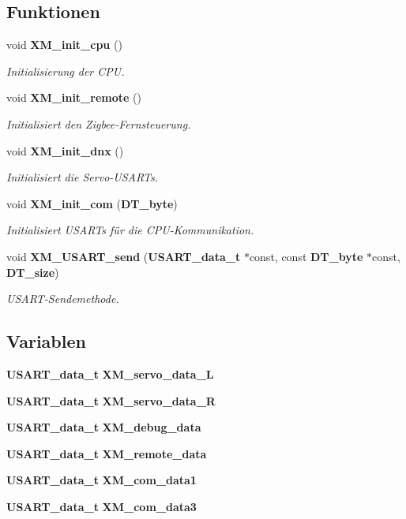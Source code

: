 \subsection*{Funktionen}
\begin{DoxyCompactItemize}
\item 
void {\bf XM\_\-init\_\-cpu} ()
\begin{DoxyCompactList}\small\item\em Initialisierung der CPU. \item\end{DoxyCompactList}\item 
void {\bf XM\_\-init\_\-remote} ()
\begin{DoxyCompactList}\small\item\em Initialisiert den Zigbee-\/Fernsteuerung. \item\end{DoxyCompactList}\item 
void {\bf XM\_\-init\_\-dnx} ()
\begin{DoxyCompactList}\small\item\em Initialisiert die Servo-\/USARTs. \item\end{DoxyCompactList}\item 
void {\bf XM\_\-init\_\-com} ({\bf DT\_\-byte})
\begin{DoxyCompactList}\small\item\em Initialisiert USARTs für die CPU-\/Kommunikation. \item\end{DoxyCompactList}\item 
void {\bf XM\_\-USART\_\-send} ({\bf USART\_\-data\_\-t} $\ast$const, const {\bf DT\_\-byte} $\ast$const, {\bf DT\_\-size})
\begin{DoxyCompactList}\small\item\em USART-\/Sendemethode. \item\end{DoxyCompactList}\end{DoxyCompactItemize}
\subsection*{Variablen}
\begin{DoxyCompactItemize}
\item 
{\bf USART\_\-data\_\-t} {\bf XM\_\-servo\_\-data\_\-L}
\item 
{\bf USART\_\-data\_\-t} {\bf XM\_\-servo\_\-data\_\-R}
\item 
{\bf USART\_\-data\_\-t} {\bf XM\_\-debug\_\-data}
\item 
{\bf USART\_\-data\_\-t} {\bf XM\_\-remote\_\-data}
\item 
{\bf USART\_\-data\_\-t} {\bf XM\_\-com\_\-data1}
\item 
{\bf USART\_\-data\_\-t} {\bf XM\_\-com\_\-data3}
\end{DoxyCompactItemize}


